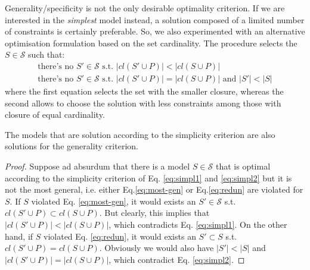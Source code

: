 Generality/specificity is not the only desirable optimality criterion. If we are interested in the \emph{simplest} model instead, a solution composed of a limited number of constraints is certainly preferable. So, we also experimented with an alternative optimisation formulation based on the set cardinality. The procedure selects the $S \in\mathcal{S}$ such that:
\begin{subequations}
   \begin{align}
    \text{there's no $S'\in\mathcal{S}$ s.t. } |cl(S'\cup P)| < |cl(S\cup P)| \label{eq:simpl1}\\
    \text{there's no $S'\in\mathcal{S}$ s.t. } |cl(S'\cup P)|=|cl(S\cup P)| \text{ and } |S'| < |S| \label{eq:simpl2}
   \end{align}
\end{subequations}
where the first equation selects the set with the smaller closure, whereas the second allows to choose the solution with less constraints among those with closure of equal cardinality.


\theoremstyle{definition}\label{th:subset-generality}
\begin{theorem}{}
The models that are solution according to the simplicity criterion are also solutions for the generality criterion.
\end{theorem} 
\begin{proof}
Suppose ad absurdum that there is a model $S\in\mathcal{S}$ that is optimal according to the simplicity criterion of Eq. \ref{eq:simpl1} and \ref{eq:simpl2} but it is not the most general, i.e. either Eq.\ref{eq:most-gen} or Eq.\ref{eq:redun} are violated for $S$. If $S$ violated Eq. \ref{eq:most-gen}, it would exists an $S'\in\mathcal{S}$ s.t. $cl(S'\cup P)\subset cl(S\cup P)$. But clearly, this implies that $|cl(S'\cup P)| < |cl(S\cup P)|$, which contradicts Eq. \ref{eq:simpl1}. On the other hand, if $S$ violated Eq. \ref{eq:redun}, it would exists an $S' \subset S$ s.t. $cl(S'\cup P)=cl(S\cup P)$. Obviously we would also have $|S'| < |S|$ and $|cl(S'\cup P)|=|cl(S\cup P)|$, which contradict Eq. \ref{eq:simpl2}. 
\end{proof}

